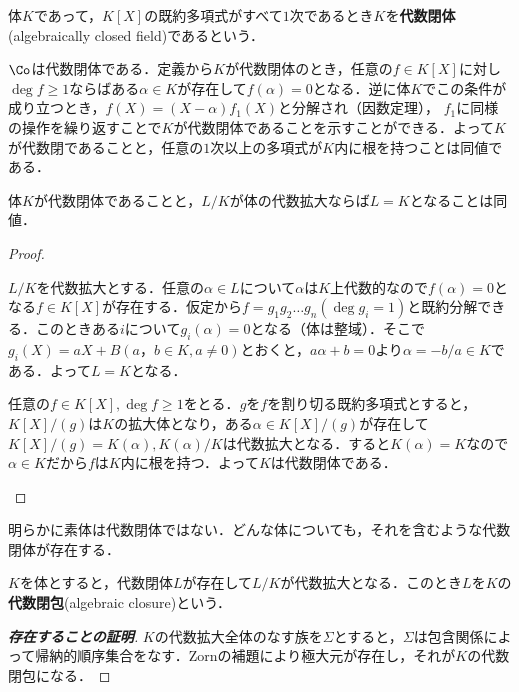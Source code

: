 \begin{defi}[代数閉体]
	体$K$であって，$K[X]$の既約多項式がすべて$1$次であるとき$K$を\textbf{代数閉体}(algebraically closed field)であるという．
\end{defi}

$\Co$は代数閉体である．定義から$K$が代数閉体のとき，任意の$f\in K[X]$に対し$\deg f\geq1$ならばある$\alpha\in K$が存在して$f(\alpha)=0$となる．逆に体$K$でこの条件が成り立つとき，$f(X)=(X-\alpha)f_1(X)$と分解され（因数定理）， $f_1$に同様の操作を繰り返すことで$K$が代数閉体であることを示すことができる．よって$K$が代数閉であることと，任意の$1$次以上の多項式が$K$内に根を持つことは同値である．

\begin{prop}
	体$K$が代数閉体であることと，$L/K$が体の代数拡大ならば$L=K$となることは同値．
\end{prop}

\begin{proof}
	\begin{eqv}
		\item $L/K$を代数拡大とする．任意の$\alpha\in L$について$\alpha$は$K$上代数的なので$f(\alpha)=0$となる$f\in K[X]$が存在する．仮定から$f=g_1g_2\dots g_n (\deg g_i=1)$と既約分解できる．このときある$i$について$g_i(\alpha)=0$となる（体は整域）．そこで$g_i(X)=aX+B (a，b\in K, a\neq0)$とおくと，$a\alpha+b=0$より$\alpha=-b/a\in K$である．よって$L=K$となる．
	
	\item 任意の$f\in K[X],\deg f\geq1$をとる．$g$を$f$を割り切る既約多項式とすると，$K[X]/(g)$は$K$の拡大体となり，ある$\alpha\in K[X]/(g)$が存在して$K[X]/(g)=K(\alpha),K(\alpha)/K$は代数拡大となる．すると$K(\alpha)=K$なので$\alpha\in K$だから$f$は$K$内に根を持つ．よって$K$は代数閉体である．
	\end{eqv}
\end{proof}

明らかに素体は代数閉体ではない．どんな体についても，それを含むような代数閉体が存在する．

\begin{defi}[代数閉包]
	$K$を体とすると，代数閉体$L$が存在して$L/K$が代数拡大となる．このとき$L$を$K$の\textbf{代数閉包}(algebraic closure)という．
\end{defi}

\begin{proof}[\textbf{存在することの証明}]
	$K$の代数拡大全体のなす族を$\Sigma$とすると，$\Sigma$は包含関係によって帰納的順序集合をなす．Zornの補題により極大元が存在し，それが$K$の代数閉包になる．
\end{proof}
